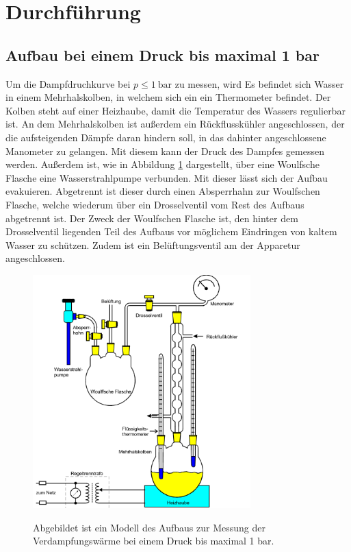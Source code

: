 



\section{Durchführung}
\label{sec:Durchführung}

    \subsection{Aufbau bei einem Druck bis maximal 1 bar}
    Um die Dampfdruchkurve bei $p\leq\qty{1}{\bar}$ zu messen, wird 
    Es befindet sich Wasser in einem Mehrhalskolben, in welchem sich ein ein Thermometer befindet.
    Der Kolben steht auf einer Heizhaube, damit die Temperatur des Wassers regulierbar ist.
    An dem Mehrhalskolben ist außerdem ein Rückflusskühler angeschlossen, der die aufsteigenden Dämpfe daran hindern soll, in das dahinter angeschlossene Manometer zu gelangen.
    Mit diesem kann der Druck des Dampfes gemessen werden.
    Außerdem ist, wie in Abbildung \ref{fig:aufbau1} dargestellt, über eine Woulfsche Flasche eine Wasserstrahlpumpe verbunden.
    Mit dieser lässt sich der Aufbau evakuieren.
    Abgetrennt ist dieser durch einen Absperrhahn zur Woulfschen Flasche, welche wiederum über ein Drosselventil vom Rest des Aufbaus abgetrennt ist.
    Der Zweck der Woulfschen Flasche ist, den hinter dem Drosselventil liegenden Teil des Aufbaus vor möglichem Eindringen von kaltem Wasser zu schützen.
    Zudem ist ein Belüftungsventil am der Apparetur angeschlossen.

    \begin{figure}[H]
        \centering
        \includegraphics[height=9cm]{Bilder/Aufbau1.png}
        \label{fig:aufbau1}
        \caption{Abgebildet ist ein Modell des Aufbaus zur Messung der Verdampfungswärme bei einem Druck bis maximal 1 bar.}
    \end{figure}

